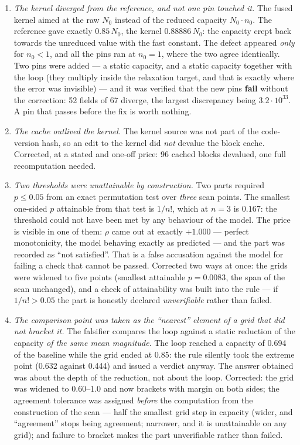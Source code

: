 \begin{enumerate}
\item \emph{The kernel diverged from the reference, and not one pin touched it.} The fused kernel aimed at the raw $N_0$ instead of the reduced capacity $N_0\cdot n_0$. The reference gave exactly $0.85\,N_0$, the kernel $0.88886\,N_0$: the capacity crept back towards the unreduced value with the fast constant. The defect appeared \emph{only} for $n_0<1$, and all the pins ran at $n_0=1$, where the two agree identically. Two pins were added --- a static capacity, and a static capacity together with the loop (they multiply inside the relaxation target, and that is exactly where the error was invisible) --- and it was verified that the new pins \textbf{fail} without the correction: 52 fields of 67 diverge, the largest discrepancy being $3.2\cdot10^{33}$. A pin that passes before the fix is worth nothing.
\item \emph{The cache outlived the kernel.} The kernel source was not part of the code-version hash, so an edit to the kernel did \emph{not} devalue the block cache. Corrected, at a stated and one-off price: 96 cached blocks devalued, one full recomputation needed.
\item \emph{Two thresholds were unattainable by construction.} Two parts required $p\le0.05$ from an exact permutation test over \emph{three} scan points. The smallest one-sided $p$ attainable from that test is $1/n!$, which at $n=3$ is $0.167$: the threshold could not have been met by any behaviour of the model. The price is visible in one of them: $\rho$ came out at exactly $+1.000$ --- perfect monotonicity, the model behaving exactly as predicted --- and the part was recorded as ``not satisfied''. That is a false accusation against the model for failing a check that cannot be passed. Corrected two ways at once: the grids were widened to five points (smallest attainable $p=0.0083$, the span of the scan unchanged), and a check of attainability was built into the rule --- if $1/n!>0.05$ the part is honestly declared \emph{unverifiable} rather than failed.
\item \emph{The comparison point was taken as the ``nearest'' element of a grid that did not bracket it.} The falsifier compares the loop against a static reduction of the capacity \emph{of the same mean magnitude}. The loop reached a capacity of 0.694 of the baseline while the grid ended at 0.85: the rule silently took the extreme point (0.632 against 0.444) and issued a verdict anyway. The answer obtained was about the depth of the reduction, not about the loop. Corrected: the grid was widened to 0.60--1.0 and now brackets with margin on both sides; the agreement tolerance was assigned \emph{before} the computation from the construction of the scan --- half the smallest grid step in capacity (wider, and ``agreement'' stops being agreement; narrower, and it is unattainable on any grid); and failure to bracket makes the part unverifiable rather than failed.
\end{enumerate}

